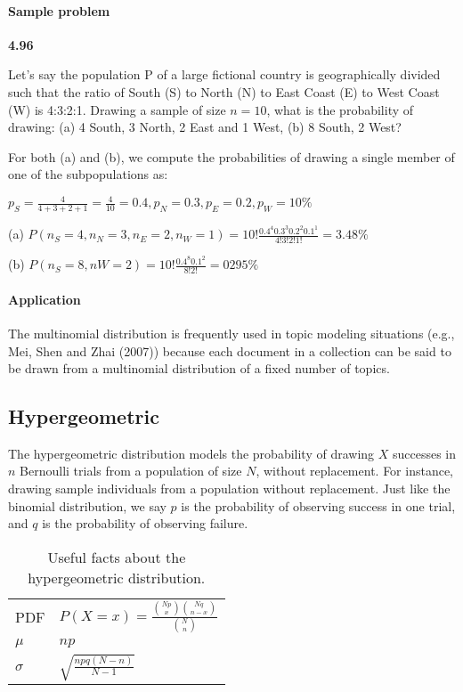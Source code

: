 \documentclass[11pt,letterpaper]{scrartcl}
\begin{document}
\paragraph{Sample problem}

\textbf{4.96}

Let's say the population P of a large fictional country is geographically divided such that the ratio of South (S) to North (N) to East Coast (E) to West Coast (W) is 4:3:2:1.
Drawing a sample of size $n=10$, what is the probability of drawing: (a) 4 South, 3 North, 2 East and 1 West, (b) 8 South, 2 West?

For both (a) and (b), we compute the probabilities of drawing a single member of one of the subpopulations as:

$p_{S} = \frac{4}{4+3+2+1} = \frac{4}{10} = 0.4, p_{N}=0.3, p_{E} = 0.2, p_{W} = 10\%$

(a) $P(n_{S}=4, n_{N} = 3, n_{E} = 2, n_{W} = 1) = 10! \frac{0.4^{4}0.3^{3}0.2^{2}0.1^{1}}{4!3!2!1!} = 3.48\%$

(b) $P(n_{S}=8, n{W}=2) = 10!\frac{0.4^{8}0.1^{2}}{8!2!} = 0295\%$

\paragraph{Application}

The multinomial distribution is frequently used in topic modeling situations (e.g., Mei, Shen and Zhai (2007)) because each document in a collection can be said to be drawn from a multinomial distribution of a fixed number of topics.

\subsection{Hypergeometric}

The hypergeometric distribution models the probability of drawing $X$ successes in $n$ Bernoulli trials from a population of size $N$, without replacement.
For instance, drawing sample individuals from a population without replacement.
Just like the binomial distribution, we say $p$ is the probability of observing success in one trial, and $q$ is the probability of observing failure.

\begin{table}[h!]
\centering
\begin{tabular}{l l} \hline
PDF & $P(X=x)= \frac{\binom{Np}{x} \binom{Nq}{n-x}}{\binom{N}{n}}$ \\
$\mu $ & $np$ \\
$\sigma $ & $\sqrt{\frac{npq(N-n)}{N-1}}$ \\ \hline
\end{tabular}
\caption{Useful facts about the hypergeometric distribution.}
\label{tab:hypergeometric}
\end{table}
\end{document}
